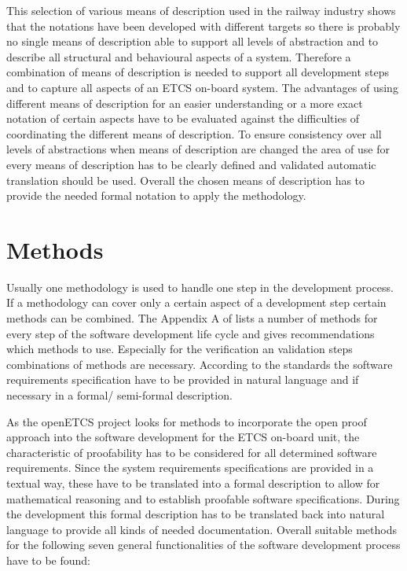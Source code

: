 \documentclass{./template/openetcs_report}
\begin{document}
This selection of various means of description used in the railway industry shows that the notations have been developed with different targets so there is probably no single means of description able to support all levels of abstraction and to describe all structural and behavioural aspects of a system. Therefore a combination of means of description is needed to support all development steps and to capture all aspects of an ETCS on-board system. The advantages of using different means of description for an easier understanding or a more exact notation of certain aspects have to be evaluated against the difficulties of coordinating the different means of description. To ensure consistency over all levels of abstractions when means of description are changed the area of use for every means of description has to be clearly defined and validated automatic translation should be used.  Overall the chosen means of description has to provide the needed formal notation to apply the methodology. 



\chapter{Methods}

\label{chap: methods}

Usually one methodology is used to handle one step in the development process. If a methodology can cover only a certain aspect of a development step certain methods can be combined. The Appendix A of \citeauthor{EN50128:2011} lists a number of methods for every step of the software development life cycle and gives recommendations which methods  to use. Especially for the verification an validation steps combinations of methods are necessary. According to the standards the software requirements specification have to be provided  in natural language and if necessary in a formal/ semi-formal description. 

As the openETCS project looks for methods to incorporate the open proof approach into the software development  for the ETCS on-board unit, the  characteristic of proofability has to be considered for all determined software requirements. Since  the system requirements specifications are provided in a textual way, these have to be translated into a formal description to allow for mathematical reasoning and to establish proofable software specifications. During the development this formal description has to be translated back into natural language to provide all kinds of needed documentation. Overall suitable methods for the following seven general functionalities of the software development process have to be found:
\end{document}
